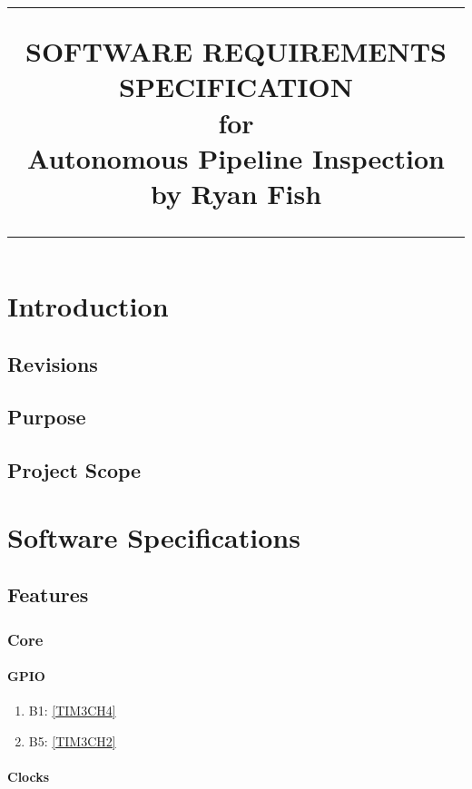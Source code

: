\documentclass{scrreprt}
\title{%
	\flushright
	\rule{16cm}{5pt}\vskip1cm
	\Huge{SOFTWARE REQUIREMENTS\\ SPECIFICATION}\\
	\vspace{2cm}
	for\\
	\vspace{2cm}
	Autonomous Pipeline Inspection\\
	\vspace{2cm}
	by Ryan Fish
	\vfill
	\rule{16cm}{5pt}
}
\date{}
\begin{document}
	\setcounter{tocdepth}{3}
	\setcounter{secnumdepth}{5}
	\maketitle
	\tableofcontents
	
	\chapter{Introduction}
	\section{Revisions}
	\section{Purpose}
	\section{Project Scope}
	\chapter{Software Specifications}
	\section{Features}
	\subsection{Core}
	\subsubsection{GPIO}
	\begin{enumerate}
		\item B1: \autoref{TIM3CH4}\label{B1}
		\item B5: \autoref{TIM3CH2}\label{B5}
	\end{enumerate}
	\subsubsection{Clocks}
\end{document}
